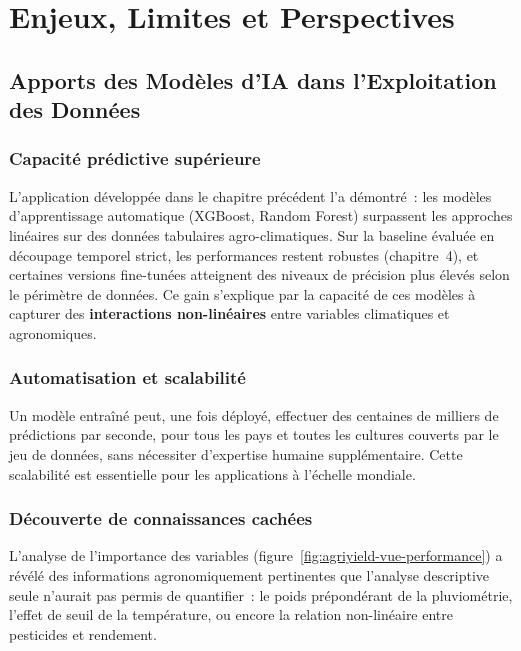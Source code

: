 \chapter{Enjeux, Limites et Perspectives}


\section{Apports des Modèles d'IA dans l'Exploitation des Données}

\subsection{Capacité prédictive supérieure}

L'application développée dans le chapitre précédent l'a démontré~: les modèles d'apprentissage automatique (XGBoost, Random Forest) surpassent les approches linéaires sur des données tabulaires agro-climatiques. Sur la baseline évaluée en découpage temporel strict, les performances restent robustes (chapitre~4), et certaines versions fine-tunées atteignent des niveaux de précision plus élevés selon le périmètre de données. Ce gain s'explique par la capacité de ces modèles à capturer des \textbf{interactions non-linéaires} entre variables climatiques et agronomiques.

\subsection{Automatisation et scalabilité}

Un modèle entraîné peut, une fois déployé, effectuer des centaines de milliers de prédictions par seconde, pour tous les pays et toutes les cultures couverts par le jeu de données, sans nécessiter d'expertise humaine supplémentaire. Cette scalabilité est essentielle pour les applications à l'échelle mondiale.

\subsection{Découverte de connaissances cachées}

L'analyse de l'importance des variables (figure~\ref{fig:agriyield-vue-performance}) a révélé des informations agronomiquement pertinentes que l'analyse descriptive seule n'aurait pas permis de quantifier~: le poids prépondérant de la pluviométrie, l'effet de seuil de la température, ou encore la relation non-linéaire entre pesticides et rendement.

